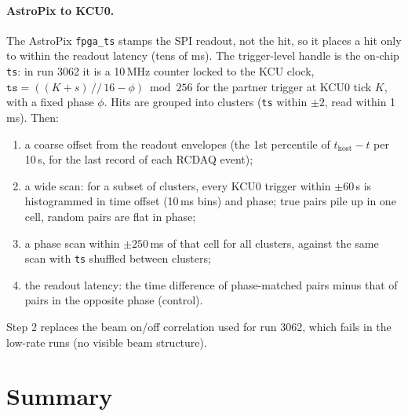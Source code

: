 \documentclass[11pt]{article}
\begin{document}
\paragraph{AstroPix to KCU0.} The AstroPix \texttt{fpga\_ts} stamps the SPI readout, not the hit, so it places
a hit only to within the readout latency (tens of ms). The trigger-level handle is the on-chip
\texttt{ts}: in run 3062 it is a 10\,MHz counter locked to the KCU clock,
$\mathtt{ts} = ((K + s)\,//\,16 - \phi) \bmod 256$ for the partner trigger at KCU0 tick $K$, with a fixed
phase $\phi$. Hits are grouped into clusters (\texttt{ts} within $\pm 2$, read within 1\,ms). Then:
\begin{enumerate}
  \item a coarse offset from the readout envelopes (the 1st percentile of $t_\mathrm{host} - t$ per 10\,s, for
        the last record of each RCDAQ event);
  \item a wide scan: for a subset of clusters, every KCU0 trigger within $\pm 60$\,s is histogrammed in time
        offset (10\,ms bins) and phase; true pairs pile up in one cell, random pairs are flat in phase;
  \item a phase scan within $\pm 250$\,ms of that cell for all clusters, against the same scan with
        \texttt{ts} shuffled between clusters;
  \item the readout latency: the time difference of phase-matched pairs minus that of pairs in the
        opposite phase (control).
\end{enumerate}
Step 2 replaces the beam on/off correlation used for run 3062, which fails in the low-rate runs (no visible
beam structure).


\section*{Summary}

\end{document}
